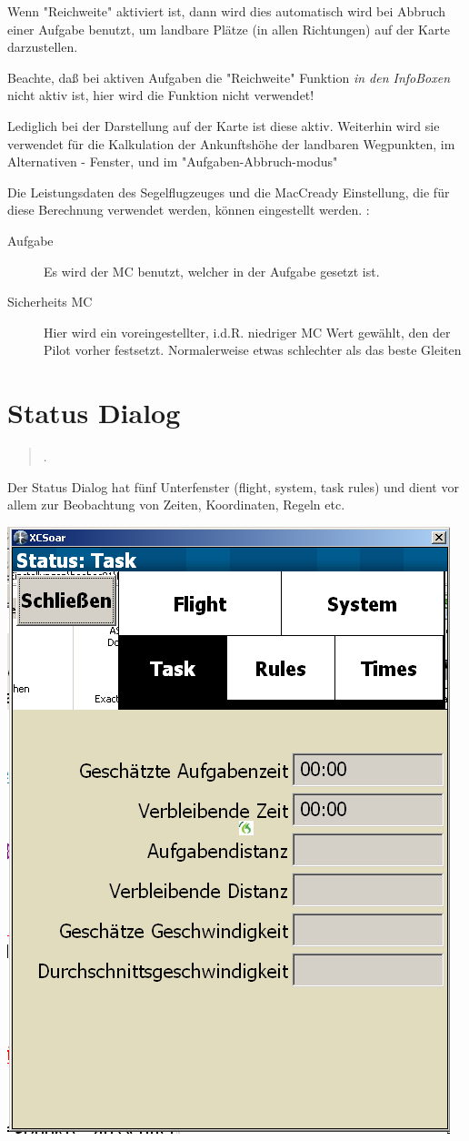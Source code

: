 Wenn "Reichweite" aktiviert ist, dann wird dies automatisch wird bei Abbruch einer Aufgabe benutzt, um landbare Plätze (in allen Richtungen) auf der Karte darzustellen.

\warning Beachte, daß bei aktiven Aufgaben die "Reichweite" Funktion \textsl{in den InfoBoxen} nicht aktiv ist, hier wird die Funktion nicht verwendet!

Lediglich bei der Darstellung auf der Karte ist diese aktiv. Weiterhin wird sie verwendet für die Kalkulation der Ankunftshöhe der landbaren Wegpunkten, im Alternativen - Fenster, und im "Aufgaben-Abbruch-modus"

Die Leistungsdaten des Segelflugzeuges und die MacCready Einstellung, die für diese Berechnung verwendet werden, können eingestellt werden.  :
\begin{description}
\item[Aufgabe] Es wird der MC benutzt, welcher in der Aufgabe gesetzt ist.
\item[Sicherheits  MC] Hier wird ein voreingestellter, i.d.R. niedriger MC Wert gewählt, den der Pilot vorher festsetzt. Normalerweise etwas schlechter als das beste Gleiten
\end{description}

\section{Status Dialog}\label{sec:aircr-stat-dial}

\begin{quote}
\blink{}\blink{}.
\end{quote}

Der Status Dialog hat fünf Unterfenster (flight, system, task rules) und dient vor allem zur Beobachtung von Zeiten, Koordinaten, Regeln etc.\

\begin{center}
\includegraphics[angle=0,width=0.5\linewidth,keepaspectratio='true']{figures/status-task.png}
\end{center}

